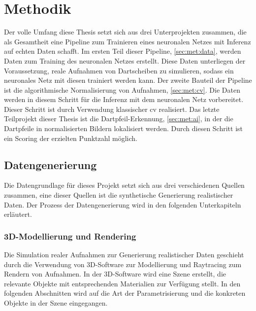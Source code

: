 
\chapter{Methodik}
\label{cha:met}

Der volle Umfang diese Thesis setzt sich aus drei Unterprojekten zusammen, die als Gesamtheit eine Pipeline zum Trainieren eines neuronalen Netzes mit Inferenz auf echten Daten schafft. Im ersten Teil dieser Pipeline, \autoref{sec:met:data}, werden Daten zum Training des neuronalen Netzes erstellt. Diese Daten unterliegen der Voraussetzung, reale Aufnahmen von Dartscheiben zu simulieren, sodass ein neuronales Netz mit diesen trainiert werden kann. Der zweite Bauteil der Pipeline ist die algorithmische Normalisierung von Aufnahmen, \autoref{sec:met:cv}. Die Daten werden in diesem Schritt für die Inferenz mit dem neuronalen Netz vorbereitet. Dieser Schritt ist durch Verwendung klassischer \ac{cv} realisiert. Das letzte Teilprojekt dieser Thesis ist die Dartpfeil-Erkennung, \autoref{sec:met:ai}, in der die Dartpfeile in normalisierten Bildern lokalisiert werden. Durch diesen Schritt ist ein Scoring der erzielten Punktzahl möglich.

\section{Datengenerierung}
\label{sec:met:data}

Die Datengrundlage für dieses Projekt setzt sich aus drei verschiedenen Quellen zusammen, eine dieser Quellen ist die synthetische Generierung realistischer Daten. Der Prozess der Datengenerierung wird in den folgenden Unterkapiteln erläutert.

\subsection{3D-Modellierung und Rendering}
\label{sec:met:data:model}

Die Simulation realer Aufnahmen zur Generierung realistischer Daten geschieht durch die Verwendung von 3D-Software zur Modellierung und Raytracing zum Rendern von Aufnahmen. In der 3D-Software wird eine Szene erstellt, die relevante Objekte mit entsprechenden Materialien zur Verfügung stellt. In den folgenden Abschnitten wird auf die Art der Parametrisierung und die konkreten Objekte in der Szene eingegangen.

